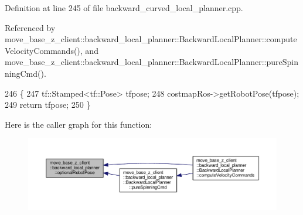 Definition at line 245 of file backward\+\_\+curved\+\_\+local\+\_\+planner.\+cpp.



Referenced by move\+\_\+base\+\_\+z\+\_\+client\+::backward\+\_\+local\+\_\+planner\+::\+Backward\+Local\+Planner\+::compute\+Velocity\+Commands(), and move\+\_\+base\+\_\+z\+\_\+client\+::backward\+\_\+local\+\_\+planner\+::\+Backward\+Local\+Planner\+::pure\+Spinning\+Cmd().


\begin{DoxyCode}
246 \{
247     tf::Stamped<tf::Pose> tfpose;
248     costmapRos->getRobotPose(tfpose);
249     \textcolor{keywordflow}{return} tfpose;
250 \}
\end{DoxyCode}


Here is the caller graph for this function\+:\nopagebreak
\begin{figure}[H]
\begin{center}
\leavevmode
\includegraphics[width=350pt]{namespacemove__base__z__client_1_1backward__local__planner_a80dbd10807e5f70adfcd0ff4dcb7c1db_icgraph}
\end{center}
\end{figure}


